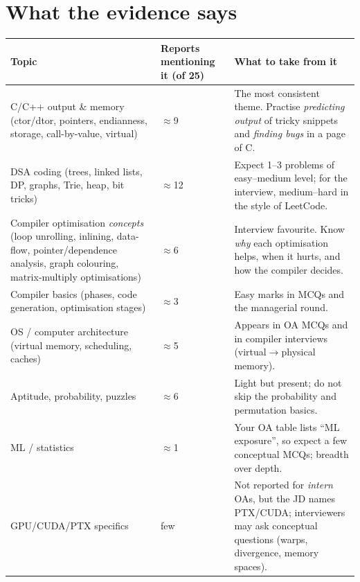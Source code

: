 \documentclass[10pt,a4paper,openany,oneside]{report}
\newcommand{\prio}[1]{\texorpdfstring{\ifcase#1\or{\color{gold}\ding{72}}\or{\color{gold}\ding{72}\ding{72}}\or{\color{gold}\ding{72}\ding{72}\ding{72}}\fi}{}}
\begin{document}
\section{What the evidence says \prio{3}}
\begin{center}
\small
\begin{xltabular}{\textwidth}{@{}L{4.4cm}C{1.9cm}Y@{}}
\toprule
\textbf{Topic} & \textbf{Reports mentioning it (of 25)} & \textbf{What to take from it}\\
\midrule\endhead
C/C++ output \& memory (ctor/dtor, pointers, endianness, storage, call-by-value, virtual) & $\approx$9 & The most consistent theme. Practise \emph{predicting output} of tricky snippets and \emph{finding bugs} in a page of C.\\
DSA coding (trees, linked lists, DP, graphs, Trie, heap, bit tricks) & $\approx$12 & Expect 1--3 problems of easy--medium level; for the interview, medium--hard in the style of LeetCode.\\
Compiler optimisation \emph{concepts} (loop unrolling, inlining, data-flow, pointer/dependence analysis, graph colouring, matrix-multiply optimisations) & $\approx$6 & Interview favourite. Know \emph{why} each optimisation helps, when it hurts, and how the compiler decides.\\
Compiler basics (phases, code generation, optimisation stages) & $\approx$3 & Easy marks in MCQs and the managerial round.\\
OS / computer architecture (virtual memory, scheduling, caches) & $\approx$5 & Appears in OA MCQs and in compiler interviews (virtual$\to$physical memory).\\
Aptitude, probability, puzzles & $\approx$6 & Light but present; do not skip the probability and permutation basics.\\
ML / statistics & $\approx$1 & Your OA table lists ``ML exposure'', so expect a few conceptual MCQs; breadth over depth.\\
GPU/CUDA/PTX specifics & few & Not reported for \emph{intern} OAs, but the JD names PTX/CUDA; interviewers may ask conceptual questions (warps, divergence, memory spaces).\\
\bottomrule
\end{xltabular}
\end{center}
\end{document}
